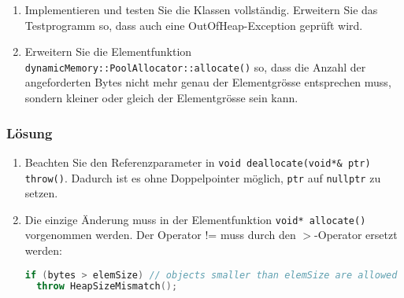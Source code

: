 \begin{enumerate}
  \item Implementieren und testen Sie die Klassen vollständig. Erweitern Sie das Testprogramm so, dass auch eine OutOfHeap-Exception geprüft wird.
\item Erweitern Sie die Elementfunktion \texttt{dynamicMemory::PoolAllocator::allocate()} so, dass die Anzahl der angeforderten Bytes nicht mehr genau der Elementgrösse entsprechen muss, sondern kleiner oder gleich der Elementgrösse sein kann.
\end{enumerate}

\subsubsection{Lösung}

\begin{enumerate}
  \item Beachten Sie den Referenzparameter in \texttt{void deallocate(void*\& ptr) throw()}. Dadurch ist es ohne Doppelpointer möglich, \texttt{ptr} auf \texttt{nullptr} zu setzen.

  
  \noindent\makebox[\linewidth]{\rule{\paperwidth}{0.4pt}}
  

  \item Die einzige Änderung muss in der Elementfunktion \texttt{void* allocate()} vorgenommen werden. Der Operator != muss durch den $>$-Operator ersetzt werden:
\begin{lstlisting}[language=C++, style=C++]
if (bytes > elemSize) // objects smaller than elemSize are allowed
  throw HeapSizeMismatch();
\end{lstlisting}

\noindent\makebox[\linewidth]{\rule{\paperwidth}{0.4pt}}

\end{enumerate}


